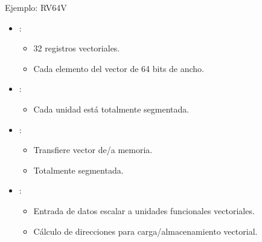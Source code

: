 \begin{frame}[t]{Ejemplo: RV64V}
\begin{itemize}
  \item {}: 
    \begin{itemize}
      \item 32 registros vectoriales.
      \item Cada elemento del vector de 64 bits de ancho.
    \end{itemize}

  \item {}: 
    \begin{itemize}
      \item Cada unidad está totalmente segmentada.
    \end{itemize}

  \item {}: 
    \begin{itemize}
      \item Transfiere vector de/a memoria.
      \item Totalmente segmentada.
    \end{itemize}

  \item {}:
    \begin{itemize}
      \item Entrada de datos escalar a unidades funcionales vectoriales.
      \item Cálculo de direcciones para carga/almacenamiento vectorial.
    \end{itemize}
\end{itemize}
\end{frame}


